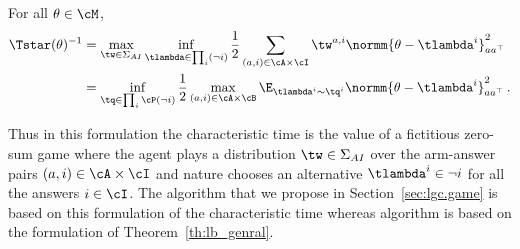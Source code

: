 \begin{lemma}
\label{lem:sion_convexify} For all $\theta\in\cM$,
\begin{align*}
  \Tstar(\theta)^{-1} &= \max_{\tw \in \Sigma_{AI}} \inf_{\tlambda\in \prod_i (\neg i) }\frac{1}{2} \sum_{(a,i)\in\cA\times\cI}\tw^{a,i}\normm{\theta - \tlambda^i}_{aa^\top}^2\\
   &= \inf_{\tq\in \prod_i\cP(\neg i) } \frac{1}{2}\max_{(a,i)\in\cA\times\cB}\E_{\tlambda^i\sim \tq^i}\normm{\theta - \tlambda^i}_{aa^\top}^2\,.
\end{align*}
\end{lemma}
Thus in this formulation the characteristic time is the value of a fictitious zero-sum game where the agent plays a distribution $\tw\in\Sigma_{AI}$ over the arm-answer pairs $(a,i)\in\cA\times\cI$ and nature chooses an alternative $\tlambda^i\in\neg i$ for all the answers $i\in\cI$. The algorithm \LGC that we propose in Section~\ref{sec:lgc.game} is based on this formulation of the characteristic time whereas algorithm \LG is based on the formulation of Theorem~\ref{th:lb_genral}.